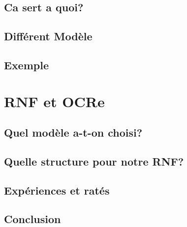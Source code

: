 \subsection{Ca sert a quoi?}

\subsection{Diff\'erent Mod\`ele}
\subsection{Exemple}

\section{RNF et OCRe}
\subsection{Quel mod\`ele a-t-on choisi?}
\subsection{Quelle structure pour notre RNF?}
\subsection{Exp\'eriences et rat\'es}
\subsection{Conclusion}

